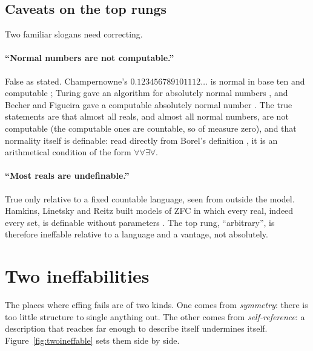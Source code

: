 \documentclass[]{article}
\theoremstyle{definition}
\theoremstyle{remark}
\begin{document}
\subsection{Caveats on the top rungs}
\label{sec:caveats}

Two familiar slogans need correcting.

\paragraph{``Normal numbers are not computable.''} False as stated. Champernowne's
$0.123456789101112\ldots$ is normal in base ten and computable \cite{Champernowne1933}; Turing gave an
algorithm for absolutely normal numbers \cite{BecherFigueiraPicchi2007}, and Becher and Figueira gave a
computable absolutely normal number \cite{BecherFigueira2002}. The true statements are that almost all
reals, and almost all normal numbers, are not computable (the computable ones are countable, so of
measure zero), and that normality itself is definable: read directly from Borel's definition
\cite{Borel1909}, it is an arithmetical condition of the form $\forall\forall\exists\forall$.

\paragraph{``Most reals are undefinable.''} True only relative to a fixed countable language, seen
from outside the model. Hamkins, Linetsky and Reitz built models of ZFC in which every real, indeed
every set, is definable without parameters \cite{HamkinsLinetskyReitz2013}. The top rung,
``arbitrary'', is therefore ineffable relative to a language and a vantage, not absolutely.

\section{Two ineffabilities}
\label{sec:ineffable}

The places where effing fails are of two kinds. One comes from \emph{symmetry}: there is too little
structure to single anything out. The other comes from \emph{self-reference}: a description that
reaches far enough to describe itself undermines itself. Figure~\ref{fig:twoineffable} sets them side
by side.
\end{document}
